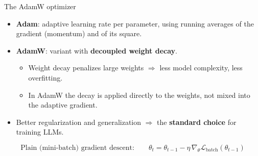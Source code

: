 \documentclass[aspectratio=169]{beamer}
\begin{document}
	\begin{frame}{The AdamW optimizer}
		\begin{itemize}
			\item \textbf{Adam}: adaptive learning rate per parameter, using running averages of the gradient (momentum) and of its square.
			\item \textbf{AdamW}: variant with \textbf{decoupled weight decay}.
			\begin{itemize}
				\item Weight decay penalizes large weights $\Rightarrow$ less model complexity, less overfitting.
				\item In AdamW the decay is applied directly to the weights, not mixed into the adaptive gradient.
			\end{itemize}
			\item Better regularization and generalization $\Rightarrow$ the \textbf{standard choice} for training LLMs.
		\end{itemize}
		\begin{equation*}
			\text{Plain (mini-batch) gradient descent:}\qquad \theta_{t} = \theta_{t-1} - \eta\,\nabla_\theta \mathcal{L}_{\text{batch}}(\theta_{t-1})
		\end{equation*}
	\end{frame}
\end{document}
